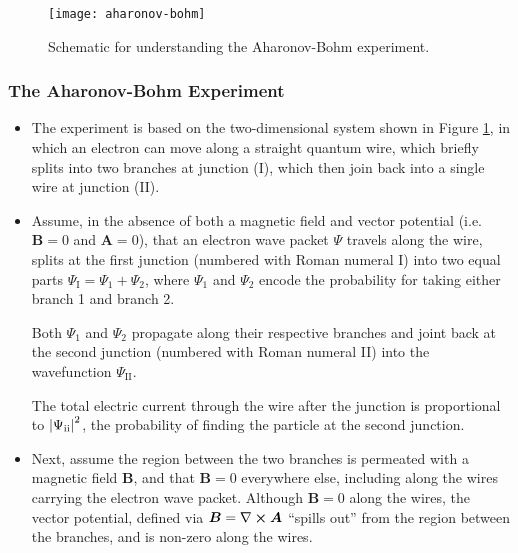 \documentclass[11pt, a4paper]{article}
\renewcommand{\curl}{\nabla \cross}
\renewcommand{\vec}[1]{\bm{#1}}  %
\newcommand{\A}{\vec{A}}  %
\newcommand{\B}{\vec{B}}  %
\renewcommand{\P}{\Psi}  %
\begin{document}
\begin{figure}[htb!]
    \centering
    \texttt{[image: aharonov-bohm]}
    \caption{Schematic for understanding the Aharonov-Bohm experiment.}
    \label{aharonov-bohm}
\end{figure}

\subsubsection{The Aharonov-Bohm Experiment}
\begin{itemize}
    \item The experiment is based on the two-dimensional system shown in Figure \ref{aharonov-bohm}, in which an electron can move along a straight quantum wire, which briefly splits into two branches at junction ($ \mathrm{I} $), which then join back into a single wire at junction ($ \mathrm{II} $).
	
	\item Assume, in the absence of both a magnetic field and vector potential (i.e. $ \B = 0 $ and $ \A = 0 $), that an electron wave packet $ \P $ travels along the wire, splits at the first junction (numbered with Roman numeral I) into two equal parts $ \P_{\text{I}} = \P_{1} + \P_{2} $, where $ \P_{1} $ and $ \P_{2} $ encode the probability for taking either branch 1 and branch 2.
	
	Both $ \P_{1} $ and $ \P_{2} $ propagate along their respective branches and joint back at the second junction (numbered with Roman numeral II) into the wavefunction $ \P_{\text{II}} $.
	
	The total electric current through the wire after the junction is proportional to $ \abs{\P_{\text{ii}}}^{2} $, the probability of finding the particle at the second junction.
	
	\item Next, assume the region between the two branches is permeated with a magnetic field $ \B $, and that $ \B = 0 $ everywhere else, including along the wires carrying the electron wave packet. Although $ \B = 0 $ along the wires, the vector potential, defined via $ \B = \curl \A $ ``spills out'' from the region between the branches, and is non-zero along the wires. 
	

\end{itemize}
\end{document}

